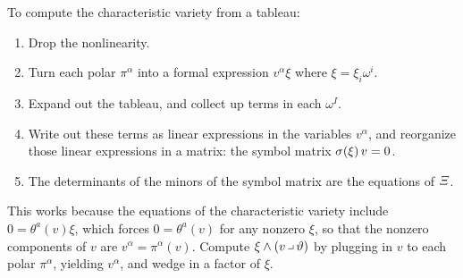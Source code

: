 To compute the characteristic variety from a tableau:
\begin{enumerate}
\item
Drop the nonlinearity.
\item
Turn each polar \(\pi^{\alpha}\) into a formal expression \(v^{\alpha}\xi\) where \(\xi=\xi_i\omega^i\).
\item
Expand out the tableau, and collect up terms in each \(\omega^I\).
\item
Write out these terms as linear expressions in the variables \(v^{\alpha}\), and reorganize those linear expressions in a matrix: the symbol matrix \(\opsymbol[]{\xi}v=0\).
\item
The determinants of the minors of the symbol matrix are the equations of \(\CV\).
\end{enumerate}
This works because the equations of the characteristic variety include \(0=\theta^a(v)\xi\), which forces \(0=\theta^a(v)\) for any nonzero \(\xi\), so that the nonzero components of \(v\) are \(v^{\alpha}=\pi^{\alpha}(v)\).
Compute \(\xi\wedge(v\hook\vartheta)\) by plugging in \(v\) to each polar \(\pi^{\alpha}\), yielding \(v^{\alpha}\), and wedge in a factor of \(\xi\).
